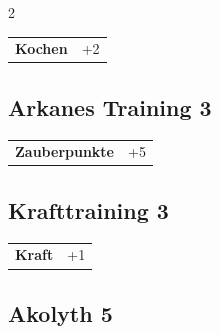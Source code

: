\begin{multicols}{2}
\begin{tcolorbox}
\vspace{3mm}

\begin{tabular}{@{}ll@{}}
    \textbf{Kochen} & +2\\
\end{tabular}


\end{tcolorbox}

\begin{tcolorbox}
    \subsection*{Arkanes Training \hfill \small{3 }}
    \tcblower




\begin{tabular}{@{}ll@{}}
    \textbf{Zauberpunkte} & +5\\
\end{tabular}


\end{tcolorbox}

\begin{tcolorbox}
    \subsection*{Krafttraining \hfill \small{3 }}
    \tcblower




\begin{tabular}{@{}ll@{}}
    \textbf{Kraft} & +1\\
\end{tabular}


\end{tcolorbox}

\begin{tcolorbox}
    \subsection*{Akolyth \hfill \small{5 }}
    \tcblower



\end{tcolorbox}
\end{multicols}
